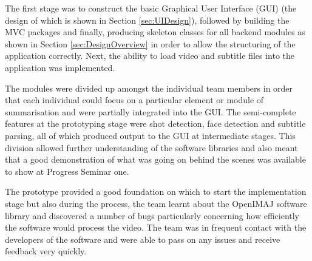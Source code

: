 The first stage was to construct the basic Graphical User Interface (GUI) (the design of which is shown in Section \ref{sec:UIDesign}), 
followed by building the MVC packages and finally, producing skeleton classes for all backend modules as shown in 
Section \ref{sec:DesignOverview} in order to allow the structuring of the application correctly. Next, the ability to load video and subtitle 
files into the application was implemented. 

The modules were divided up amongst the individual team members in order that each individual could focus on a particular element or module of 
summarisation and were partially integrated into the GUI. The semi-complete features at the prototyping stage were shot detection, face 
detection and subtitle parsing, all of which produced output to the GUI at intermediate stages. This division allowed further understanding 
of the software libraries and also meant that a good demonstration of what was going on behind the scenes was available to show at Progress 
Seminar one.

The prototype provided a good foundation on which to start the implementation stage but also during the process, the team learnt about the 
OpenIMAJ software library and discovered a number
of bugs particularly concerning how efficiently the software would process the video. The team was in frequent contact with the developers 
of the software and were able to pass on any issues and receive feedback very quickly.
